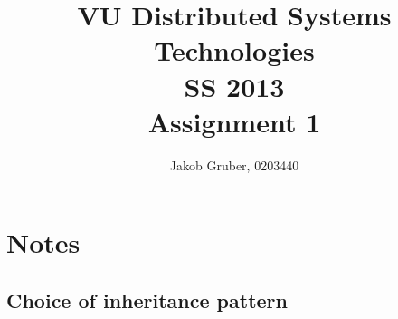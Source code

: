 \documentclass[a4paper,10pt]{article}
\title{VU Distributed Systems Technologies \\
       SS 2013 \\
       Assignment 1}
\author{Jakob Gruber, 0203440}
\begin{document}
\maketitle

\section{Notes}

\subsection{Choice of inheritance pattern}

\begin{comment}
InheritanceType: JOINED; Common table for base type, additional infos stored 
separately. SINGLE_TABLE sounds nice for our needs, but support is optional.

MappedSuperclass: the superclass contains persisted information, but is not
mapped as an entity by the JPA provider. State & mapping information common to
multiple entity classes. Non-entity superclasses don't support persistence,
and abstract entities are mapped (which we don't need).
\end{comment}
\end{document}
